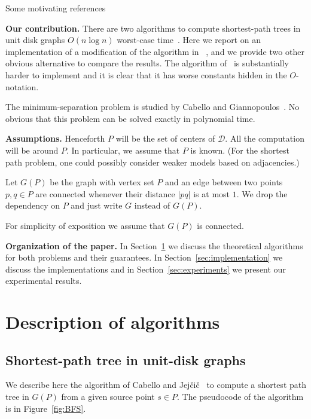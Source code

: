 \documentclass[a4paper,USenglish,numberwithinsect]{lipics}
\newcommand{\D}{\ensuremath{\mathcal{D}}}
\def\myparagraph#1{\medskip\noindent\textbf{#1.}}
\begin{document}
Some motivating references

\myparagraph{Our contribution}
There are two algorithms to compute shortest-path trees in unit disk graphs 
$O(n\log n)$ worst-case time~\cite{CJ15,eik-01}. 
Here we report on an implementation of a modification of the algorithm in ~\cite{CJ15},
and we provide two other obvious alternative to compare the results.
The algorithm of~\cite{eik-0} is substantially harder to implement and it is clear that
it has worse constants hidden in the $O$-notation.

The minimum-separation problem is studied by Cabello and Giannopoulos~\cite{CG16}.
No obvious that this problem can be solved exactly in polynomial time.

\myparagraph{Assumptions} 
Henceforth $P$ will be the set of centers of $\D$. 
All the computation will be around $P$. In particular, we assume that $P$ is known.
(For the shortest path problem, one could possibly consider weaker models based 
on adjacencies.)

Let $G(P)$ be the graph with vertex set $P$ and an edge between two points $p,q\in P$ 
are connected whenever their distance $|pq|$ is at most $1$. We drop the dependency on $P$
and just write $G$ instead of $G(P)$. 

For simplicity of exposition we assume that $G(P)$ is connected.

\myparagraph{Organization of the paper} 
In Section~\ref{sec:algorithms} we discuss the theoretical
algorithms for both problems and their guarantees.
In Section~\ref{sec:implementation} we discuss the implementations 
and in Section~\ref{sec:experiments} we present our experimental results.

\section{Description of algorithms}
\label{sec:algorithms}

\subsection{Shortest-path tree in unit-disk graphs}
\label{sec:algorithm-sptree}
We describe here the algorithm of Cabello and Jej\v{c}i\v{c}~\cite{CJ15} 
to compute a shortest path tree in $G(P)$ from a given source point $s\in P$. 
The pseudocode of the algorithm is in Figure~\ref{fig:BFS}. 
\end{document}
